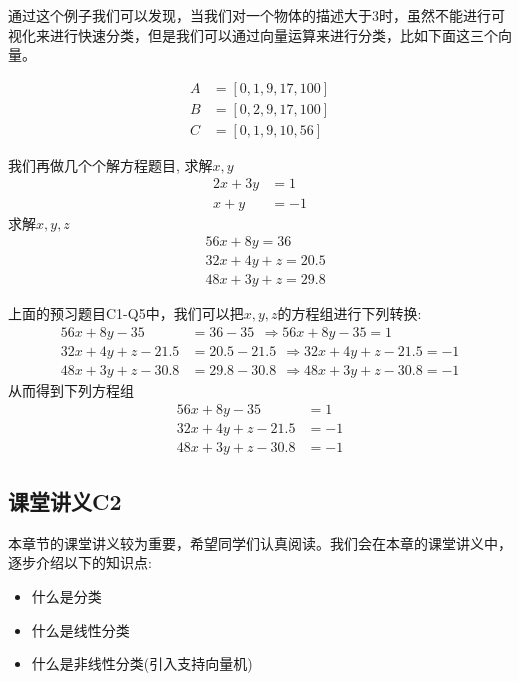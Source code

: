 \documentclass[12pt]{article}
\numberwithin{figure}{section}
\newenvironment{fullmodel}{
			\smallskip\noindent
			\begin{minipage}{\textwidth+\marginparwidth+\marginparsep}\smallskip\smallskip}
			{\smallskip\smallskip\end{minipage}\vspace{.1in}
			}
\numberwithin{equation}{section}
\newenvironment{question}[2][Question]{\begin{trivlist}
\item[\hskip \labelsep {\bfseries #1}\hskip \labelsep {\bfseries #2.}]}{\end{trivlist}}
\begin{document}
\begin{tcolorbox}[title={向量和矩阵本身就是一种可视化}]
		通过这个例子我们可以发现，当我们对一个物体的描述大于3时，虽然不能进行可视化来进行快速分类，但是我们可以通过向量运算来进行分类，比如下面这三个向量。
\end{tcolorbox}

\begin{align*}
	A& = [0, 1, 9, 17, 100] \\
	B & = [0, 2, 9, 17, 100] \\
	C & = [0, 1, 9, 10, 56] 
\end{align*}

\begin{question}{C1-Q5 解方程}
	我们再做几个个解方程题目, 求解$x, y$
	\begin{align*}
		2x + 3y & =1 \\
		x + y & = -1 
	\end{align*}
	求解$x, y, z$
	\begin{align*}
	& 56x + 8 y = 36 \\
	& 32 x + 4 y + z = 20.5 \\
	& 48 x + 3y + z = 29.8 
\end{align*}
\end{question}

\begin{fullmodel}
	上面的预习题目C1-Q5中，我们可以把$x, y, z$的方程组进行下列转换:
	\begin{align*}
		56x + 8y -35 & = 36 - 35  \ \ \Rightarrow 56x + 8y -35 = 1\\
		32x + 4y + z - 21.5 & = 20.5 - 21.5 \ \ \Rightarrow 32x + 4y + z - 21.5  = -1 \\
		48x + 3y + z - 30.8 & = 29.8 - 30.8  \ \ \Rightarrow 48x + 3y + z - 30.8 = -1  
	\end{align*}
	从而得到下列方程组
	\begin{align*}
		56x + 8y -35 & = 1\\
		32x + 4y + z - 21.5 &  = -1 \\
48x + 3y + z - 30.8 & = -1 
	\end{align*}
\end{fullmodel}


\subsection{课堂讲义C2}

本章节的课堂讲义较为重要，希望同学们认真阅读。我们会在本章的课堂讲义中，逐步介绍以下的知识点:
\begin{itemize}
	\item 什么是分类
	\item 什么是线性分类
	\item 什么是非线性分类(引入支持向量机)
\end{itemize}
\end{document}
